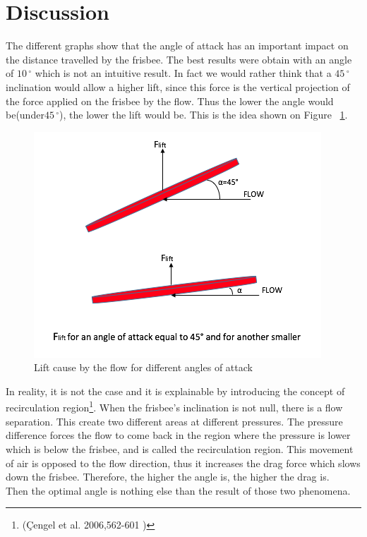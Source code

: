 \documentclass[10pt,a4paper]{report}
\begin{document}
\section{Discussion}
The different graphs show that the angle of attack has an important impact on the distance travelled by the frisbee. The best results were obtain with an angle of $10\,^{\circ}$ which is not an intuitive result. In fact we would rather think that a $45\,^{\circ}$ inclination would allow a higher lift, since this force is the vertical projection of the force applied on the frisbee by the flow. Thus the lower the angle would be(under$45\,^{\circ}$), the lower the lift would be. This is the idea shown on Figure ~\ref{Lift cause by the flow for different angle}.
\begin{figure}[H]
\centering
\includegraphics[scale=0.6]{intuitive.jpg}
\caption{Lift cause by the flow for different angles of attack}
\label{Lift cause by the flow for different angle}
\end{figure}
In reality, it is not the case and it is explainable by introducing the concept of recirculation region\footnote{(\c{C}engel et al. 2006,562-601 )}. When the frisbee's inclination is not null, there is a flow separation. This create two different areas at different pressures. The pressure difference forces the flow to come back in the region where the pressure is lower which is below the frisbee, and is called the recirculation region. This movement of air is opposed to the flow direction, thus it increases the drag force which slows down the frisbee. Therefore, the higher the angle is, the higher the drag is.
\\Then the optimal angle is nothing else than the result of those two phenomena.
\end{document}
